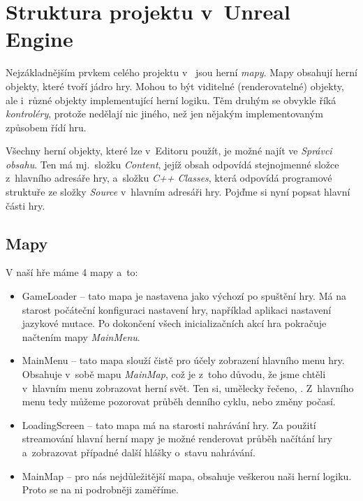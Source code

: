 
\section{Struktura projektu v~Unreal Engine}
\label{sec:ueStructure}

Nejzákladnějším prvkem celého projektu v~\UEu{} jsou herní \textit{mapy}. Mapy obsahují herní objekty, které tvoří jádro hry. Mohou to být viditelné (renderovatelné) objekty, ale i~různé objekty implementující herní logiku. Těm druhým se obvykle říká \textit{kontroléry}, protože nedělají nic jiného, než jen nějakým implementovaným způsobem řídí hru.

Všechny herní objekty, které lze v~Editoru použít, je možné najít ve \textit{Správci obsahu}. Ten má mj.~složku \textit{Content}, jejíž obsah odpovídá stejnojmenné složce z~hlavního adresáře hry, a~složku \textit{C++ Classes}, která odpovídá programové struktuře ze složky \textit{Source} v~hlavním adresáři hry. Pojďme si nyní popsat hlavní části hry.


\subsection{Mapy}

V naší hře máme 4 mapy a~to:

\begin{itemize}
	\item GameLoader -- tato mapa je nastavena jako výchozí po spuštění hry. Má na starost počáteční konfiguraci nastavení hry, například aplikaci nastavení jazykové mutace. Po dokončení všech inicializačních akcí hra pokračuje načtením mapy \textit{MainMenu}.
	\item MainMenu -- tato mapa slouží čistě pro účely zobrazení hlavního menu hry. Obsahuje v~sobě mapu \textit{MainMap}, což je z~toho důvodu, že jsme chtěli v~hlavním menu zobrazovat herní svět. Ten si, umělecky řečeno, . Z~hlavního menu tedy můžeme pozorovat průběh denního cyklu, nebo změny počasí.
	\item LoadingScreen -- tato mapa má na starosti nahrávání hry. Za použití streamování hlavní herní mapy je možné renderovat průběh načítání hry a~zobrazovat případné další hlášky o~stavu nahrávání.
	\item MainMap -- pro nás nejdůležitější mapa, obsahuje veškerou naši herní logiku. Proto se na ni podrobněji zaměříme.
\end{itemize}

